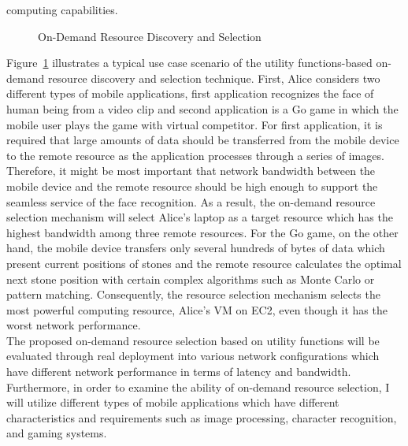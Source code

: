 computing capabilities.\\
%
\begin{figure}
\centering
{}
\caption{On-Demand Resource Discovery and Selection}
\label{fig:futurework}
\end{figure}
%
Figure~\ref{fig:futurework} illustrates a typical use case scenario of
the utility functions-based on-demand resource discovery and selection
technique.
%
First, Alice considers two different types of mobile applications, first
application recognizes the face of human being from a video clip and
second application is a Go game in which the mobile user plays
the game with virtual competitor.
%
For first application, it is required that large amounts of data should
be transferred from the mobile device to the remote resource as the
application processes through a series of images.
%
Therefore, it might be most important that network bandwidth between the
mobile device and the remote resource should be high enough to support
the seamless service of the face recognition.
%
As a result, the on-demand resource selection mechanism will select
Alice's laptop as a target resource which has the highest bandwidth
among three remote resources.
%
For the Go game, on the other hand, the mobile device transfers only
several hundreds of bytes of data which present current positions of
stones and the remote resource calculates the optimal next stone
position with certain complex algorithms such as Monte Carlo or pattern
matching.
%
Consequently, the resource selection mechanism selects the most powerful
computing resource, Alice's VM on EC2, even though it has the worst
network performance.\\
%
The proposed on-demand resource selection based on utility functions
will be evaluated through real deployment into various network
configurations which have different network performance in terms of
latency and bandwidth.
%
Furthermore, in order to examine the ability of on-demand resource
selection, I will utilize different types of mobile applications which
have different characteristics and requirements such as image
processing, character recognition, and gaming systems.
%

